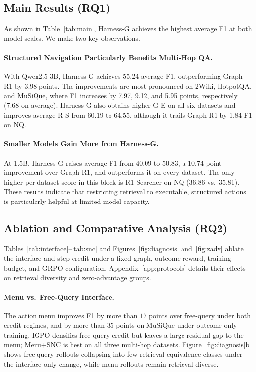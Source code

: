 \documentclass[letterpaper]{article} %
\begin{document}
\subsection{Main Results (RQ1)}

As shown in Table~\ref{tab:main}, Harness-G achieves the highest average F1 at both model scales. We make two key observations.

\paragraph{Structured Navigation Particularly Benefits Multi-Hop QA.}
With Qwen2.5-3B, Harness-G achieves 55.24 average F1, outperforming Graph-R1 by 3.98 points.
The improvements are most pronounced on 2Wiki, HotpotQA, and MuSiQue, where F1 increases by 7.97, 9.12, and 5.95 points, respectively (7.68 on average).
Harness-G also obtains higher G-E on all six datasets and improves average R-S from 60.19 to 64.55, although it trails Graph-R1 by 1.84 F1 on NQ.

\paragraph{Smaller Models Gain More from Harness-G.}
At 1.5B, Harness-G raises average F1 from 40.09 to 50.83, a 10.74-point improvement over Graph-R1, and outperforms it on every dataset.
The only higher per-dataset score in this block is R1-Searcher on NQ (36.86 vs.\ 35.81).
These results indicate that restricting retrieval to executable, structured actions is particularly helpful at limited model capacity.


\subsection{Ablation and Comparative Analysis (RQ2)}

Tables~\ref{tab:interface}--\ref{tab:snc} and Figures~\ref{fig:diagnosis} and~\ref{fig:zadv} ablate the interface and step credit under a fixed graph, outcome reward, training budget, and GRPO configuration. Appendix~\ref{app:protocols} details their effects on retrieval diversity and zero-advantage groups.

\paragraph{Menu vs.\ Free-Query Interface.}
The action menu improves F1 by more than $17$ points over free-query under both credit regimes, and by more than $35$ points on MuSiQue under outcome-only training.
IGPO \citep{igpo2025} densifies free-query credit but leaves a large residual gap to the menu; Menu+SNC is best on all three multi-hop datasets.
Figure~\ref{fig:diagnosis}b shows free-query rollouts collapsing into few retrieval-equivalence classes under the interface-only change, while menu rollouts remain retrieval-diverse.
\end{document}
